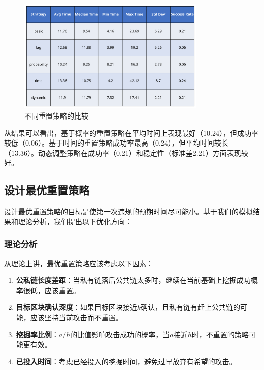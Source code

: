 \documentclass[12pt,a4paper]{article}
\begin{document}
\begin{CJK}{UTF8}{gbsn}
\begin{figure}[H] %
    \centering
    \includegraphics[width=0.8\textwidth]{images/reset_strategy_table.png}
    \caption{不同重置策略的比较}
\end{figure}

从结果可以看出，基于概率的重置策略在平均时间上表现最好（10.24），但成功率较低（0.06）。基于时间的重置策略成功率最高（0.24），但平均时间较长（13.36）。动态调整策略在成功率（0.21）和稳定性（标准差2.21）方面表现较好。

\subsection{设计最优重置策略}

设计最优重置策略的目标是使第一次违规的预期时间尽可能小。基于我们的模拟结果和理论分析，我们提出以下优化方向：

\subsubsection{理论分析}

从理论上讲，最优重置策略应该考虑以下因素：

\begin{enumerate}
    \item \textbf{公私链长度差距}：当私有链落后公共链太多时，继续在当前基础上挖掘成功概率很低，应该重置。
    \item \textbf{目标区块确认深度}：如果目标区块接近$k$确认，且私有链有赶上公共链的可能，应该坚持当前攻击而不重置。
    \item \textbf{挖掘率比例}：$a/h$的比值影响攻击成功的概率，当$a$接近$h$时，不重置的策略可能更有效。
    \item \textbf{已投入时间}：考虑已经投入的挖掘时间，避免过早放弃有希望的攻击。
\end{enumerate}


\end{CJK}
\end{document}
